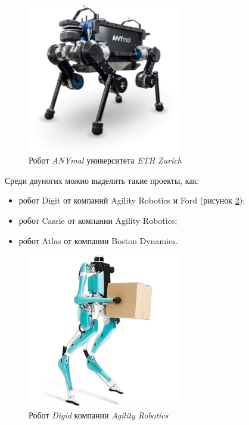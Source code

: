 \begin{figure}[h!]
    \centering
    \includegraphics[width=0.6\textwidth]{chapter_intro/figure2.png}
    \caption{Робот \textit{ANYmal} университета \textit{ ETH Zurich}}
    \label{fig:intro2}
\end{figure}

Среди двуногих можно выделить такие проекты, как:

\begin{itemize}
    \item робот Digit от компаний Agility Robotics и Ford (рисунок \ref{fig:intro3});
    \item робот Cassie от компании Agility Robotics;
    \item робот Atlas от компании Boston Dynamics.
\end{itemize}

\begin{figure}[h]
    \centering
    \includegraphics[width=0.6\textwidth]{chapter_intro/figure3.jpg}
    \caption{Робот \textit{Digid} компании \textit{ Agility Robotics}}
    \label{fig:intro3}
\end{figure}

